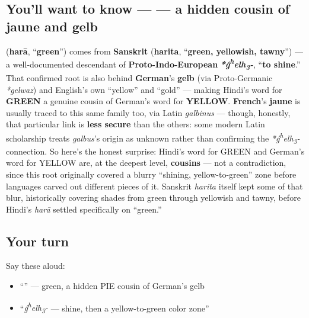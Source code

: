 \subsection*{You'll want to know —  — a hidden cousin of jaune and gelb}
\textbf{} (\textbf{harā}, \textquotedblleft{}\textbf{green}\textquotedblright{}) comes from \textbf{Sanskrit} \textbf{} (\textbf{harita}, \textquotedblleft{}\textbf{green, yellowish, tawny}\textquotedblright{}) — a well-documented descendant of \textbf{Proto-Indo-European} \emph{\textbf{*ǵ\textsuperscript{h}elh\textsubscript{3}-}}, \textquotedblleft{}\textbf{to shine}.\textquotedblright{} That confirmed root is also behind \textbf{German}'s \textbf{gelb} (via Proto-Germanic \emph{*gelwaz}) and English's own \textquotedblleft{}yellow\textquotedblright{} and \textquotedblleft{}gold\textquotedblright{} — making Hindi's word for \textbf{GREEN} a genuine cousin of German's word for \textbf{YELLOW}. \textbf{French}'s \textbf{jaune} is usually traced to this same family too, via Latin \emph{galbinus} — though, honestly, that particular link is \textbf{less secure} than the others: some modern Latin scholarship treats \emph{galbus}'s origin as unknown rather than confirming the \emph{*ǵ\textsuperscript{h}elh\textsubscript{3}-} connection. So here's the honest surprise: Hindi's word for GREEN and German's word for YELLOW are, at the deepest level, \textbf{cousins} — not a contradiction, since this root originally covered a blurry \textquotedblleft{}shining, yellow-to-green\textquotedblright{} zone before languages carved out different pieces of it. Sanskrit \emph{harita} itself kept some of that blur, historically covering shades from green through yellowish and tawny, before Hindi's \emph{harā} settled specifically on \textquotedblleft{}green.\textquotedblright{}

\subsection*{Your turn}
Say these aloud:

\begin{itemize}
\raggedright
  \item \textquotedblleft{}\textquotedblright{} — green, a hidden PIE cousin of German's gelb
  \item \textquotedblleft{}\emph{ǵ\textsuperscript{h}elh\textsubscript{3}-} — shine, then a yellow-to-green color zone\textquotedblright{}
\end{itemize}

